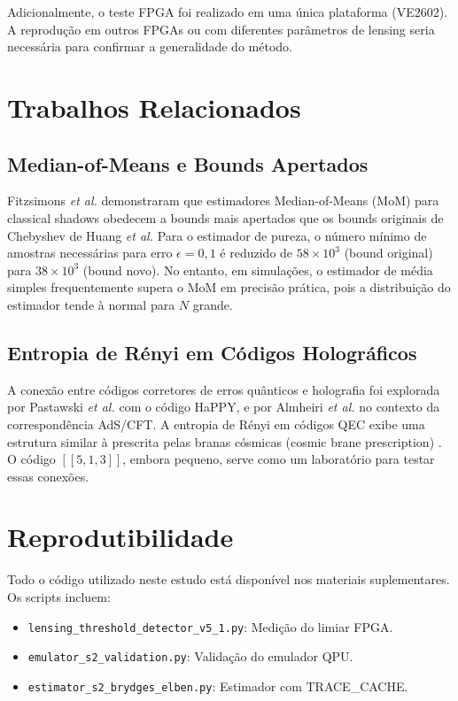 \documentclass[12pt,a4paper,oneside]{book}
\theoremstyle{definition}
\theoremstyle{remark}
\begin{document}
Adicionalmente, o teste FPGA foi realizado em uma única plataforma (VE2602). A reprodução em outros FPGAs ou com diferentes parâmetros de lensing seria necessária para confirmar a generalidade do método.

\section{Trabalhos Relacionados}

\subsection{Median-of-Means e Bounds Apertados}

Fitzsimons \textit{et al.} \cite{fitzsimons2025classical} demonstraram que estimadores Median-of-Means (MoM) para classical shadows obedecem a bounds mais apertados que os bounds originais de Chebyshev de Huang \textit{et al.} Para o estimador de pureza, o número mínimo de amostras necessárias para erro $\epsilon = 0{,}1$ é reduzido de $58 \times 10^3$ (bound original) para $38 \times 10^3$ (bound novo). No entanto, em simulações, o estimador de média simples frequentemente supera o MoM em precisão prática, pois a distribuição do estimador tende à normal para $N$ grande.

\subsection{Entropia de Rényi em Códigos Holográficos}

A conexão entre códigos corretores de erros quânticos e holografia foi explorada por Pastawski \textit{et al.} \cite{pastawski2015holographic} com o código HaPPY, e por Almheiri \textit{et al.} \cite{almheiri2019holographic} no contexto da correspondência AdS/CFT. A entropia de Rényi em códigos QEC exibe uma estrutura similar à prescrita pelas branas cósmicas (cosmic brane prescription) \cite{dong2016holographic}. O código $[[5,1,3]]$, embora pequeno, serve como um laboratório para testar essas conexões.

\section{Reprodutibilidade}

Todo o código utilizado neste estudo está disponível nos materiais suplementares. Os scripts incluem:
\begin{itemize}
    \item \texttt{lensing\_threshold\_detector\_v5\_1.py}: Medição do limiar FPGA.
    \item \texttt{emulator\_s2\_validation.py}: Validação do emulador QPU.
    \item \texttt{estimator\_s2\_brydges\_elben.py}: Estimador com TRACE\_CACHE.
\end{itemize}
\end{document}
